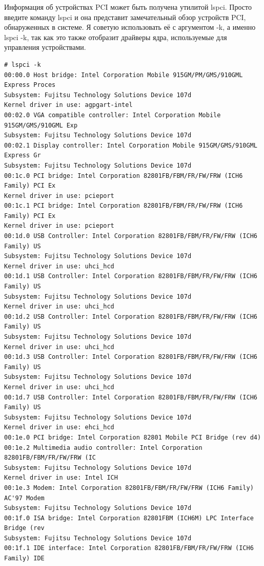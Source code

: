 \documentclass[10pt]{book}
\begin{document}
Информация об устройствах PCI может быть получена утилитой lspci. Просто введите команду lspci и она представит замечательный обзор устройств PCI, обнаруженных в системе. Я советую использовать её с аргументом -k, а именно lspci -k, так как это также отобразит драйверы ядра, используемые для управления устройствами. 

\vspace{3mm}
\begin{tcolorbox}
\begin{lstlisting}
# lspci -k
00:00.0 Host bridge: Intel Corporation Mobile 915GM/PM/GMS/910GML Express Proces
Subsystem: Fujitsu Technology Solutions Device 107d
Kernel driver in use: agpgart-intel
00:02.0 VGA compatible controller: Intel Corporation Mobile 915GM/GMS/910GML Exp
Subsystem: Fujitsu Technology Solutions Device 107d
00:02.1 Display controller: Intel Corporation Mobile 915GM/GMS/910GML Express Gr
Subsystem: Fujitsu Technology Solutions Device 107d
00:1c.0 PCI bridge: Intel Corporation 82801FB/FBM/FR/FW/FRW (ICH6 Family) PCI Ex
Kernel driver in use: pcieport
00:1c.1 PCI bridge: Intel Corporation 82801FB/FBM/FR/FW/FRW (ICH6 Family) PCI Ex
Kernel driver in use: pcieport
00:1d.0 USB Controller: Intel Corporation 82801FB/FBM/FR/FW/FRW (ICH6 Family) US
Subsystem: Fujitsu Technology Solutions Device 107d
Kernel driver in use: uhci_hcd
00:1d.1 USB Controller: Intel Corporation 82801FB/FBM/FR/FW/FRW (ICH6 Family) US
Subsystem: Fujitsu Technology Solutions Device 107d
Kernel driver in use: uhci_hcd
00:1d.2 USB Controller: Intel Corporation 82801FB/FBM/FR/FW/FRW (ICH6 Family) US
Subsystem: Fujitsu Technology Solutions Device 107d
Kernel driver in use: uhci_hcd
00:1d.3 USB Controller: Intel Corporation 82801FB/FBM/FR/FW/FRW (ICH6 Family) US
Subsystem: Fujitsu Technology Solutions Device 107d
Kernel driver in use: uhci_hcd
00:1d.7 USB Controller: Intel Corporation 82801FB/FBM/FR/FW/FRW (ICH6 Family) US
Subsystem: Fujitsu Technology Solutions Device 107d
Kernel driver in use: ehci_hcd
00:1e.0 PCI bridge: Intel Corporation 82801 Mobile PCI Bridge (rev d4)
00:1e.2 Multimedia audio controller: Intel Corporation 82801FB/FBM/FR/FW/FRW (IC
Subsystem: Fujitsu Technology Solutions Device 107d
Kernel driver in use: Intel ICH
00:1e.3 Modem: Intel Corporation 82801FB/FBM/FR/FW/FRW (ICH6 Family) AC'97 Modem
Subsystem: Fujitsu Technology Solutions Device 107d
00:1f.0 ISA bridge: Intel Corporation 82801FBM (ICH6M) LPC Interface Bridge (rev
Subsystem: Fujitsu Technology Solutions Device 107d
00:1f.1 IDE interface: Intel Corporation 82801FB/FBM/FR/FW/FRW (ICH6 Family) IDE

\end{lstlisting}
\end{tcolorbox}
\end{document}
